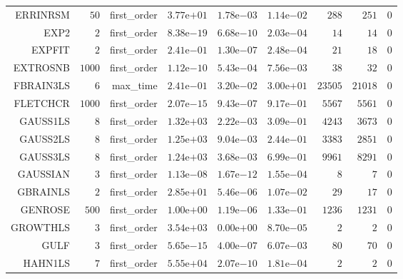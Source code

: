 \begin{longtable}{rrrrrrrrr}
ERRINRSM & \(    50\) & first\_order & \( 3.77\)e\(+01\) & \( 1.78\)e\(-03\) & \( 1.14\)e\(-02\) & \(   288\) & \(   251\) & \(     0\) \\
EXP2 & \(     2\) & first\_order & \( 8.38\)e\(-19\) & \( 6.68\)e\(-10\) & \( 2.03\)e\(-04\) & \(    14\) & \(    14\) & \(     0\) \\
EXPFIT & \(     2\) & first\_order & \( 2.41\)e\(-01\) & \( 1.30\)e\(-07\) & \( 2.48\)e\(-04\) & \(    21\) & \(    18\) & \(     0\) \\
EXTROSNB & \(  1000\) & first\_order & \( 1.12\)e\(-10\) & \( 5.43\)e\(-04\) & \( 7.56\)e\(-03\) & \(    38\) & \(    32\) & \(     0\) \\
FBRAIN3LS & \(     6\) & max\_time & \( 2.41\)e\(-01\) & \( 3.20\)e\(-02\) & \( 3.00\)e\(+01\) & \( 23505\) & \( 21018\) & \(     0\) \\
FLETCHCR & \(  1000\) & first\_order & \( 2.07\)e\(-15\) & \( 9.43\)e\(-07\) & \( 9.17\)e\(-01\) & \(  5567\) & \(  5561\) & \(     0\) \\
GAUSS1LS & \(     8\) & first\_order & \( 1.32\)e\(+03\) & \( 2.22\)e\(-03\) & \( 3.09\)e\(-01\) & \(  4243\) & \(  3673\) & \(     0\) \\
GAUSS2LS & \(     8\) & first\_order & \( 1.25\)e\(+03\) & \( 9.04\)e\(-03\) & \( 2.44\)e\(-01\) & \(  3383\) & \(  2851\) & \(     0\) \\
GAUSS3LS & \(     8\) & first\_order & \( 1.24\)e\(+03\) & \( 3.68\)e\(-03\) & \( 6.99\)e\(-01\) & \(  9961\) & \(  8291\) & \(     0\) \\
GAUSSIAN & \(     3\) & first\_order & \( 1.13\)e\(-08\) & \( 1.67\)e\(-12\) & \( 1.55\)e\(-04\) & \(     8\) & \(     7\) & \(     0\) \\
GBRAINLS & \(     2\) & first\_order & \( 2.85\)e\(+01\) & \( 5.46\)e\(-06\) & \( 1.07\)e\(-02\) & \(    29\) & \(    17\) & \(     0\) \\
GENROSE & \(   500\) & first\_order & \( 1.00\)e\(+00\) & \( 1.19\)e\(-06\) & \( 1.33\)e\(-01\) & \(  1236\) & \(  1231\) & \(     0\) \\
GROWTHLS & \(     3\) & first\_order & \( 3.54\)e\(+03\) & \( 0.00\)e\(+00\) & \( 8.70\)e\(-05\) & \(     2\) & \(     2\) & \(     0\) \\
GULF & \(     3\) & first\_order & \( 5.65\)e\(-15\) & \( 4.00\)e\(-07\) & \( 6.07\)e\(-03\) & \(    80\) & \(    70\) & \(     0\) \\
HAHN1LS & \(     7\) & first\_order & \( 5.55\)e\(+04\) & \( 2.07\)e\(-10\) & \( 1.81\)e\(-04\) & \(     2\) & \(     2\) & \(     0\) \\

\end{longtable}
